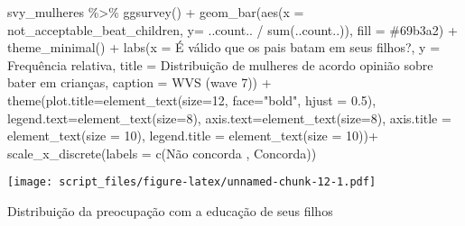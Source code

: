 \documentclass[
]{article}
\newenvironment{Shaded}{\begin{snugshade}}{\end{snugshade}}
\newcommand{\AttributeTok}[1]{\textcolor[rgb]{0.77,0.63,0.00}{#1}}
\newcommand{\DecValTok}[1]{\textcolor[rgb]{0.00,0.00,0.81}{#1}}
\newcommand{\FloatTok}[1]{\textcolor[rgb]{0.00,0.00,0.81}{#1}}
\newcommand{\FunctionTok}[1]{\textcolor[rgb]{0.00,0.00,0.00}{#1}}
\newcommand{\NormalTok}[1]{#1}
\newcommand{\SpecialCharTok}[1]{\textcolor[rgb]{0.00,0.00,0.00}{#1}}
\newcommand{\StringTok}[1]{\textcolor[rgb]{0.31,0.60,0.02}{#1}}
\begin{document}
\begin{Shaded}
\begin{Highlighting}[]
\NormalTok{svy\_mulheres }\SpecialCharTok{\%\textgreater{}\%}
  \FunctionTok{ggsurvey}\NormalTok{() }\SpecialCharTok{+}
  \FunctionTok{geom\_bar}\NormalTok{(}\FunctionTok{aes}\NormalTok{(}\AttributeTok{x =}\NormalTok{ not\_acceptable\_beat\_children, }\AttributeTok{y=}\NormalTok{ ..count.. }\SpecialCharTok{/} \FunctionTok{sum}\NormalTok{(..count..)), }\AttributeTok{fill =} \StringTok{\textquotesingle{}\#69b3a2\textquotesingle{}}\NormalTok{) }\SpecialCharTok{+}
  \FunctionTok{theme\_minimal}\NormalTok{() }\SpecialCharTok{+}
  \FunctionTok{labs}\NormalTok{(}\AttributeTok{x =} \StringTok{\textquotesingle{}É válido que os pais batam em seus filhos?\textquotesingle{}}\NormalTok{,}
       \AttributeTok{y =} \StringTok{\textquotesingle{}Frequência relativa\textquotesingle{}}\NormalTok{,}
       \AttributeTok{title =} \StringTok{\textquotesingle{}Distribuição de mulheres de acordo opinião sobre bater em crianças\textquotesingle{}}\NormalTok{,}
       \AttributeTok{caption =} \StringTok{\textquotesingle{}WVS (wave 7)\textquotesingle{}}\NormalTok{) }\SpecialCharTok{+}
  \FunctionTok{theme}\NormalTok{(}\AttributeTok{plot.title=}\FunctionTok{element\_text}\NormalTok{(}\AttributeTok{size=}\DecValTok{12}\NormalTok{, }\AttributeTok{face=}\StringTok{"bold"}\NormalTok{, }\AttributeTok{hjust =} \FloatTok{0.5}\NormalTok{),}
        \AttributeTok{legend.text=}\FunctionTok{element\_text}\NormalTok{(}\AttributeTok{size=}\DecValTok{8}\NormalTok{),}
        \AttributeTok{axis.text=}\FunctionTok{element\_text}\NormalTok{(}\AttributeTok{size=}\DecValTok{8}\NormalTok{),}
        \AttributeTok{axis.title =} \FunctionTok{element\_text}\NormalTok{(}\AttributeTok{size =} \DecValTok{10}\NormalTok{),}
        \AttributeTok{legend.title =} \FunctionTok{element\_text}\NormalTok{(}\AttributeTok{size =} \DecValTok{10}\NormalTok{))}\SpecialCharTok{+}
  \FunctionTok{scale\_x\_discrete}\NormalTok{(}\AttributeTok{labels =} \FunctionTok{c}\NormalTok{(}\StringTok{\textquotesingle{}Não concorda \textquotesingle{}}\NormalTok{, }\StringTok{\textquotesingle{}Concorda\textquotesingle{}}\NormalTok{))}
\end{Highlighting}
\end{Shaded}

\texttt{[image: script\_files/figure-latex/unnamed-chunk-12-1.pdf]}

Distribuição da preocupação com a educação de seus filhos
\end{document}
